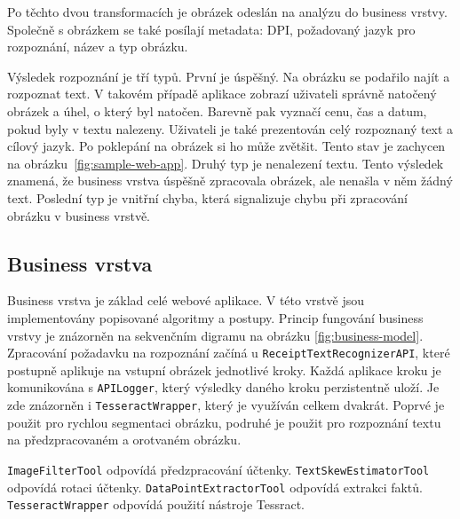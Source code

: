 \documentclass[thesis=B,czech]{FITthesis}[2019/12/23]
\def\myit#1{\texttt{#1}}
\begin{document}
Po těchto dvou transformacích je obrázek odeslán na analýzu do business vrstvy. Společně s obrázkem se také posílají metadata: DPI, požadovaný jazyk pro rozpoznání, název a typ obrázku.

Výsledek rozpoznání je tří typů. První je úspěšný. Na obrázku se podařilo najít a rozpoznat text. V takovém případě aplikace zobrazí uživateli správně natočený obrázek a úhel, o který byl natočen. Barevně pak vyznačí cenu, čas a datum, pokud byly v textu nalezeny. Uživateli je také prezentován celý rozpoznaný text a cílový jazyk. Po poklepání na obrázek si ho může zvětšit. Tento stav je zachycen na obrázku~\ref{fig:sample-web-app}. Druhý typ je nenalezení textu. Tento výsledek znamená, že business vrstva úspěšně zpracovala obrázek, ale nenašla v něm žádný text. Poslední typ je vnitřní chyba, která signalizuje chybu při zpracování obrázku v business vrstvě.

\subsection{Business vrstva}
\label{sec:business-layer}
Business vrstva je základ celé webové aplikace. V této vrstvě jsou implementovány popisované algoritmy a postupy. Princip fungování business vrstvy je znázorněn na sekvenčním digramu na obrázku \ref{fig:business-model}. Zpracování požadavku na rozpoznání začíná u \myit{ReceiptTextRecognizerAPI}, které postupně aplikuje na vstupní obrázek jednotlivé kroky. Každá aplikace kroku je komunikována s \myit{APILogger}, který výsledky daného kroku perzistentně uloží. Je zde znázorněn i \myit{TesseractWrapper}, který je využíván celkem dvakrát. Poprvé je použit pro rychlou segmentaci obrázku, podruhé je použit pro rozpoznání textu na předzpracovaném a orotvaném obrázku.

\myit{ImageFilterTool} odpovídá předzpracování účtenky. \myit{TextSkewEstimatorTool} odpovídá rotaci účtenky. \myit{DataPointExtractorTool} odpovídá extrakci faktů. \myit{TesseractWrapper} odpovídá použití nástroje Tessract.

\end{document}

